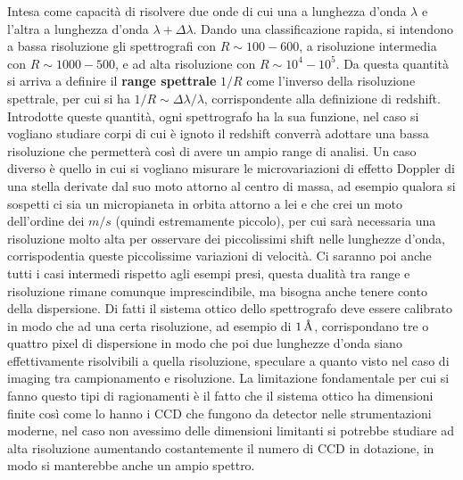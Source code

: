Intesa come capacità di risolvere due onde di cui una a lunghezza d'onda $\lambda$ e l'altra a lunghezza d'onda $\lambda+\Delta\lambda$. Dando una classificazione rapida, si intendono a bassa risoluzione gli spettrografi con $R\sim 100-600$, a risoluzione intermedia con $R\sim 1000-500$, e ad alta risoluzione con $R\sim 10^4-10^5$. Da questa quantità si arriva a definire il \textbf{range spettrale} $1/R$ come l'inverso della risoluzione spettrale, per cui si ha $1/R \sim \Delta\lambda/\lambda$, corrispondente alla definizione di redshift. Introdotte queste quantità, ogni spettrografo ha la sua funzione, nel caso si vogliano studiare corpi di cui è ignoto il redshift converrà adottare una bassa risoluzione che permetterà così di avere un ampio range di analisi. Un caso diverso è quello in cui si vogliano misurare le microvariazioni di effetto Doppler di una stella derivate dal suo moto attorno al centro di massa, ad esempio qualora si sospetti ci sia un micropianeta in orbita attorno a lei e che crei un moto dell'ordine dei $m/s$ (quindi estremamente piccolo), per cui sarà necessaria una risoluzione molto alta per osservare dei piccolissimi shift nelle lunghezze d'onda, corrispodentia queste piccolissime variazioni di velocità. Ci saranno poi anche tutti i casi intermedi rispetto agli esempi presi, questa dualità tra range e risoluzione rimane comunque imprescindibile, ma bisogna anche tenere conto della dispersione. Di fatti il sistema ottico dello spettrografo deve essere calibrato in modo che ad una certa risoluzione, ad esempio di $1\, \mbox{\normalfont\AA}$, corrispondano tre o quattro pixel di dispersione in modo che poi due lunghezze d'onda siano effettivamente risolvibili a quella risoluzione, speculare a quanto visto nel caso di imaging tra campionamento e risoluzione. La limitazione fondamentale per cui si fanno questo tipi di ragionamenti è il fatto che il sistema ottico ha dimensioni finite così come lo hanno i CCD che fungono da detector nelle strumentazioni moderne, nel caso non avessimo delle dimensioni limitanti si potrebbe studiare ad alta risoluzione aumentando costantemente il numero di CCD in dotazione, in modo si manterebbe anche un ampio spettro.

